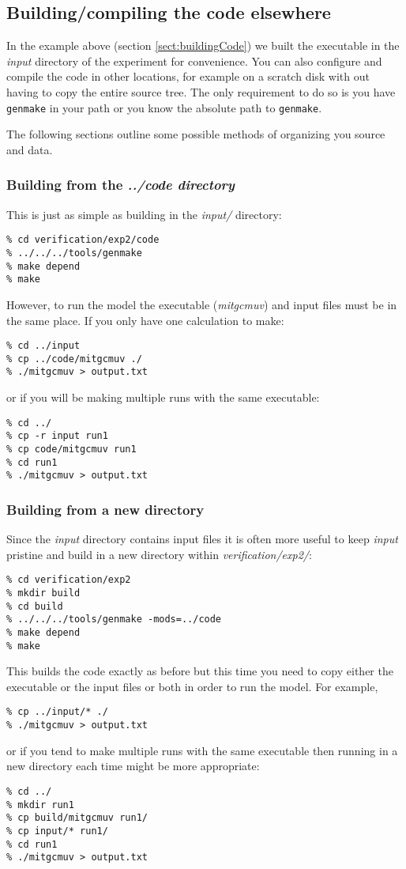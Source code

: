 \subsection{Building/compiling the code elsewhere}

In the example above (section \ref{sect:buildingCode}) we built the
executable in the {\em input} directory of the experiment for
convenience. You can also configure and compile the code in other
locations, for example on a scratch disk with out having to copy the
entire source tree. The only requirement to do so is you have {\tt
genmake} in your path or you know the absolute path to {\tt genmake}.

The following sections outline some possible methods of organizing you
source and data.

\subsubsection{Building from the {\em ../code directory}}

This is just as simple as building in the {\em input/} directory:
\begin{verbatim}
% cd verification/exp2/code
% ../../../tools/genmake
% make depend
% make
\end{verbatim}
However, to run the model the executable ({\em mitgcmuv}) and input
files must be in the same place. If you only have one calculation to make:
\begin{verbatim}
% cd ../input
% cp ../code/mitgcmuv ./
% ./mitgcmuv > output.txt
\end{verbatim}
or if you will be making multiple runs with the same executable:
\begin{verbatim}
% cd ../
% cp -r input run1
% cp code/mitgcmuv run1
% cd run1
% ./mitgcmuv > output.txt
\end{verbatim}

\subsubsection{Building from a new directory}

Since the {\em input} directory contains input files it is often more
useful to keep {\em input} pristine and build in a new directory
within {\em verification/exp2/}:
\begin{verbatim}
% cd verification/exp2
% mkdir build
% cd build
% ../../../tools/genmake -mods=../code
% make depend
% make
\end{verbatim}
This builds the code exactly as before but this time you need to copy
either the executable or the input files or both in order to run the
model. For example,
\begin{verbatim}
% cp ../input/* ./
% ./mitgcmuv > output.txt
\end{verbatim}
or if you tend to make multiple runs with the same executable then
running in a new directory each time might be more appropriate:
\begin{verbatim}
% cd ../
% mkdir run1
% cp build/mitgcmuv run1/
% cp input/* run1/
% cd run1
% ./mitgcmuv > output.txt
\end{verbatim}

